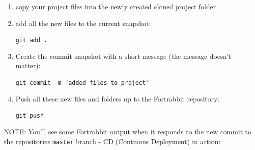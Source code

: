 \documentclass[a4paperpaper,openright]{book}
\begin{document}
\begin{enumerate}
\def\labelenumi{\arabic{enumi}.}
\item
  copy your project files into the newly created cloned project folder
\item
  add all the new files to the current snapshot:

  \texttt{git\ add\ .}
\item
  Create the commit snapshot with a short message (the message doesn't
  matter):

  \texttt{git\ commit\ -m\ "added\ files\ to\ project"}
\item
  Push all these new files and folders up to the Fortrabbit repository:

  \texttt{git\ push}
\end{enumerate}

NOTE: You'll see some Fortrabbit output when it responds to the new
commit to the repositories \texttt{master} branch - CD (Contiuous
Deployment) in action:
\end{document}
